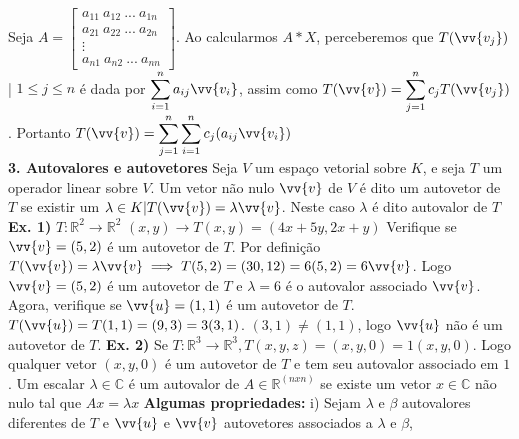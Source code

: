 \documentclass[11pt,a4paper]{article}
\newcommand\tab[1][1.835cm]{\hspace*{#1}}
\begin{document}
\begin{flushleft}
\tab Seja $A = \begin{bmatrix} a_{11} \ a_{12} \ ... \ a_{1n} \\ a_{21} \ a_{22} \ ... \ a_{2n} \\ \vdots \\ a_{n1} \ a_{n2} \ ... \ a_{nn} \end{bmatrix}$. Ao calcularmos $A*X$, perceberemos que $ T(\vv{v_j})$ | $ 1 \leq j \leq n  $ é dada por $ \displaystyle\sum_{i=1}^n a_{ij}\vv{v_i} $, assim como $T(\vv{v}) = \displaystyle\sum_{j=1}^n c_jT(\vv{v_j}) $. Portanto $T(\vv{v}) = \displaystyle\sum_{j=1}^n \displaystyle\sum_{i=1}^n c_j(a_{ij}\vv{v_i})$ \linebreak 
\\
\textbf{3. Autovalores e autovetores}\linebreak
\tab Seja $V$ um espaço vetorial sobre $K$, e seja $T$ um operador linear sobre $V$. Um vetor não nulo $\vv{v}$ de $V$ é dito um autovetor de $T $ se existir um $\lambda \in K | T(\vv{v}) = \lambda\vv{v}$. Neste caso $\lambda$ é dito autovalor de $T$ \linebreak
\newline
\tab \textbf{Ex. 1)} $T: \mathbb{R}^2 \rightarrow \mathbb{R}^2$  
$(x,y) \rightarrow T(x,y) = (4x+5y,2x+y)$ Verifique se $\vv{v} = (5,2)$ é um autovetor de $T $. Por definição $ T( \vv{v} ) = \lambda\vv{v} \implies T(5,2) = (30,12) =6(5,2) = 6\vv{v}$. Logo $\vv{v} = (5,2)$ é um autovetor de $T$ e $\lambda = 6$ é o autovalor associado $\vv{v}$.
\newline \tab Agora, verifique se $\vv{u} = (1,1)$ é um autovetor de $T$. 
\newline \tab $T(\vv{u}) = T(1,1) = (9,3) = 3(3,1)$. $(3,1) \neq (1,1)$, logo $\vv{u}$ não é um autovetor de $T$. 
\newline \newline \tab \textbf{Ex. 2)} Se $T: \mathbb{R}^3 \rightarrow \mathbb{R}^3, T(x,y,z) = (x,y,0) = 1 (x,y,0)$. Logo qualquer vetor $(x,y,0)$ é um autovetor de $T$ e tem seu autovalor associado em $1$.
\newline \newline \tab Um escalar $\lambda \in \mathbb{C}$ é um autovalor de $A \in \mathbb{R}^(nxn)$ se existe um vetor $x \in \mathbb{C}$ não nulo tal que $Ax = \lambda x$
\newline \tab \textbf{Algumas propriedades: }
\newline \tab i) Sejam $\lambda$ e $\beta$ autovalores diferentes de $T$ e $\vv{u}$ e $\vv{v}$ autovetores associados a $\lambda$ e $\beta$,

\end{flushleft}
\end{document}
